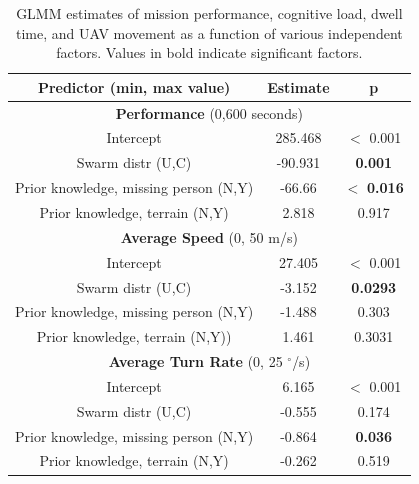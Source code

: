\documentclass{article}
\begin{document}
	\begin{table}
		\centering
		\caption{GLMM estimates of mission performance, cognitive load, dwell time, and UAV movement as a function of various independent factors.  Values in bold indicate significant factors.}
		\begin{tabular}{|c|c|c|}
			
			\hline
			\textbf{Predictor (min, max value)} & \textbf{Estimate} & \textbf{p} \\ \hline 
			
			\multicolumn{3}{|c|}{\textbf{Performance} (0,600 seconds)} \\ \hline 
			Intercept & 285.468 & $<$ 0.001 \\ \hline
			
			Swarm distr (U,C) & -90.931 & \textbf{0.001} \\ \hline
			
			Prior knowledge, missing person (N,Y)    & -66.66 & $<$ \textbf{0.016} \\ \hline
			Prior knowledge, terrain (N,Y) & 2.818 & 0.917 \\ \hline 
			
			\multicolumn{3}{|c|}{\textbf{Average Speed} (0, 50 m/s)} \\ \hline 
			
			Intercept & 27.405 & $<$ 0.001 \\ \hline
			
			Swarm distr (U,C) & -3.152 & \textbf{0.0293} \\ \hline
			
			Prior knowledge, missing person (N,Y)  & -1.488 &  0.303 \\ \hline
			
			Prior knowledge, terrain (N,Y)) & 1.461 & 0.3031 \\ \hline
			
			\multicolumn{3}{|c|}{ \textbf{Average Turn Rate} (0, 25 $^\circ$/s)}  \\ \hline 
			Intercept & 6.165 & $<$ 0.001 \\ \hline
			
			Swarm distr (U,C) & -0.555 & 0.174 \\ \hline
			
			Prior knowledge, missing person (N,Y)    & -0.864 &  \textbf{0.036} \\ \hline
			
			Prior knowledge, terrain (N,Y) & -0.262 & 0.519 \\ \hline 
			

\end{tabular}
\end{table}
\end{document}
